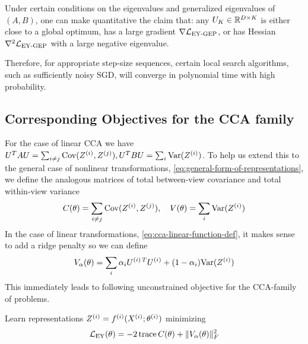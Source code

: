 \begin{corollary}
    Under certain conditions on the eigenvalues and generalized eigenvalues of $(A,B)$, one can make quantitative the claim that:
    any $U_K \in \mathbb{R}^{D \times K}$ is either close to a global optimum, has a large gradient $\nabla \mathcal{L}_\text{EY-GEP}$, or has Hessian $\nabla^2 \mathcal{L}_\text{EY-GEP}$ with a large negative eigenvalue.

    Therefore, for appropriate step-size sequences, certain local search algorithms, such as sufficiently noisy SGD, will converge in polynomial time with high probability.
\end{corollary}

\subsection{Corresponding Objectives for the CCA family}
For the case of linear CCA we have $U^T A U = \sum_{i \neq j} \mathrm{Cov}(Z^{(i)}, Z^{(j)}), U^T B U = \sum_{i} \mathrm{Var}(Z^{(i)})$.
To help us extend this to the general case of nonlinear transformations, \cref{eq:general-form-of-representations}, we define the analogous matrices of total between-view covariance and total within-view variance
\begin{align}\label{eq:def-C-V-matrices}
\vphantom{\bigl(\bigr)} %
C(\theta) = \sum_{i \neq j} \Cov(Z\sps{i}, Z\sps{j}), \quad
V(\theta) = \sum_{i} \Var(Z\sps{i})
\end{align}
In the case of linear transformations, \cref{eq:cca-linear-function-def}, it makes sense to add a ridge penalty so we can define
\begin{align}\label{eq:v-alpha-ridge-definition}
V_\alpha(\theta) = \sum_i \alpha_i {U^{(i)\,T}} U^{(i)} +  (1 - \alpha_i) \mathrm{Var}(Z^{(i)})
\end{align}
This immediately leads to following unconstrained objective for the CCA-family of problems.
\begin{definition}
    Learn representations $Z^{(i)} = f^{(i)}( X^{(i)}; \theta^{(i)})$ minimizing
    \begin{align}\label{eq:EY-loss-def-C-V}
    \mathcal{L}_\text{EY}(\theta) = - 2 \operatorname{trace} C(\theta) + \lVert V_\alpha(\theta)\rVert_F^2
    \end{align}
\end{definition}

